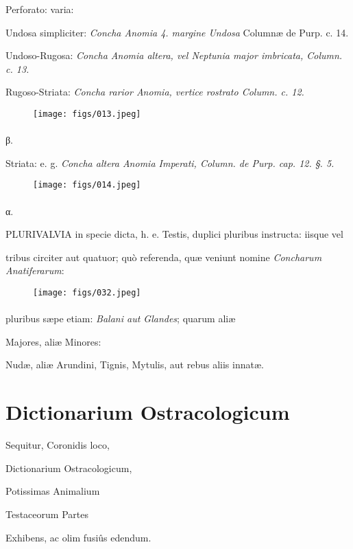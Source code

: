 \documentclass[a4paper, 11pt, oneside, polutonikogreek, german]{article}
\begin{document}
Perforato: varia:

Undosa simpliciter: \emph{Concha Anomia 4. margine Undosa} Columnæ de Purp. c. 14.

Undoso-Rugosa: \emph{Concha Anomia altera, vel Neptunia major imbricata, Column. c. 13.}

Rugoso-Striata: \emph{Concha rarior Anomia, vertice rostrato Column. c. 12.}

\begin{figure}[H]
\centering
\texttt{[image: figs/013.jpeg]}
\end{figure}
\paragraph{}
β.

Striata: e. g. \emph{Concha altera Anomia Imperati, Column. de Purp. cap. 12. §. 5.}

\begin{figure}[H]
\centering
\texttt{[image: figs/014.jpeg]}
\end{figure}
\paragraph{}
α.

PLURIVALVIA in specie dicta, h. e. Testis, duplici pluribus instructa: iisque vel

tribus circiter aut quatuor; quò referenda, quæ veniunt nomine \emph{Concharum Anatiferarum}:

\begin{figure}[H]
\centering
\texttt{[image: figs/032.jpeg]}
\end{figure}
\paragraph{}
pluribus sæpe etiam: \emph{Balani aut Glandes}; quarum aliæ

Majores, aliæ Minores:

Nudæ, aliæ Arundini, Tignis, Mytulis, aut rebus aliis innatæ.

\bigskip
\centerline{\EightStarTaper}
\centerline{\EightStarTaper\EightStarTaper}
\bigskip
\clearpage
\section{Dictionarium Ostracologicum}
\begin{center}
\footnotesize Sequitur, Coronidis loco,

Dictionarium Ostracologicum,

\footnotesize Potissimas Animalium

\footnotesize  Testaceorum Partes

\footnotesize Exhibens, ac olim fusiûs edendum.
\end{center}
\end{document}
